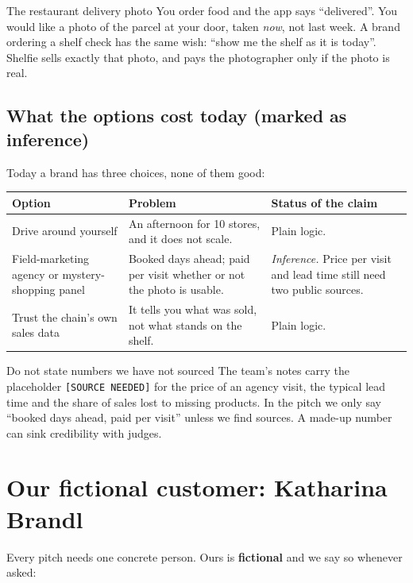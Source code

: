 \begin{analogybox}{The restaurant delivery photo}
You order food and the app says ``delivered''. You would like a photo of the parcel at your door, taken \emph{now}, not last week. A brand ordering a shelf check has the same wish: ``show me the shelf as it is today''. Shelfie sells exactly that photo, and pays the photographer only if the photo is real.
\end{analogybox}

\subsection{What the options cost today (marked as inference)}
Today a brand has three choices, none of them good:

\begin{center}
\small
\begin{tabularx}{\textwidth}{@{}p{3.4cm}XX@{}}
\toprule
\textbf{Option} & \textbf{Problem} & \textbf{Status of the claim}\\
\midrule
Drive around yourself & An afternoon for 10 stores, and it does not scale. & Plain logic.\\
Field-marketing agency or mystery-shopping panel & Booked days ahead; paid per visit whether or not the photo is usable. & \emph{Inference.} Price per visit and lead time still need two public sources.\\
Trust the chain's own sales data & It tells you what was sold, not what stands on the shelf. & Plain logic.\\
\bottomrule
\end{tabularx}
\end{center}

\begin{warningbox}{Do not state numbers we have not sourced}
The team's notes carry the placeholder \texttt{[SOURCE NEEDED]} for the price of an agency visit, the typical lead time and the share of sales lost to missing products. In the pitch we only say ``booked days ahead, paid per visit'' unless we find sources. A made-up number can sink credibility with judges.
\end{warningbox}

\section{Our fictional customer: Katharina Brandl}
Every pitch needs one concrete person. Ours is \textbf{fictional} and we say so whenever asked:

